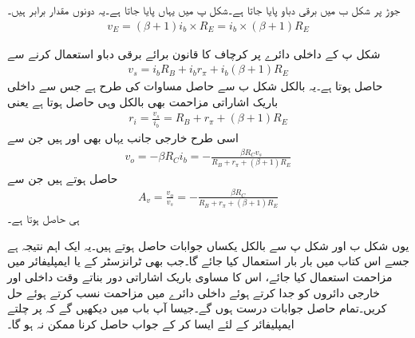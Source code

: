 جوڑ  پر شکل  ب میں  برقی دباو پایا جاتا ہے۔شکل  پ میں یہاں  پایا جاتا ہے۔یہ دونوں مقدار برابر ہیں۔
\begin{align*}
v_E=\left(\beta+1 \right) i_b \times R_E =i_b \times \left(\beta+1 \right)R_E
\end{align*}

شکل  پ کے داخلی دائرے پر کرچاف کا قانون برائے برقی دباو استعمال کرنے سے
\begin{align*}
v_s = i_b R_B+i_b r_{\pi}  + i_b \left(\beta+1 \right )R_E
\end{align*}
حاصل ہوتا ہے۔یہ بالکل شکل  ب سے حاصل مساوات کی طرح ہے  جس سے داخلی باریک اشاراتی مزاحمت بھی بالکل وہی حاصل ہوتا ہے یعنی
\begin{align*}
r_i=\frac{v_s}{i_b}=R_B+r_{\pi}+\left(\beta+1 \right )R_E
\end{align*}
اسی طرح خارجی جانب یہاں بھی  اور  ہیں جن سے
\begin{align*}
v_o=-\beta R_C i_b = -\frac{\beta R_C v_s}{R_B+r_{\pi}+\left ( \beta+1\right )R_E}
\end{align*}
حاصل ہوتے ہیں جن سے
\begin{align*}
A_v=\frac{v_o}{v_s}=-\frac{\beta R_C}{R_B+r_{\pi}+\left(\beta+1 \right )R_E}
\end{align*} 
ہی حاصل ہوتا ہے۔

یوں شکل  ب اور شکل  پ سے بالکل یکساں جوابات حاصل ہوتے ہیں۔یہ ایک اہم نتیجہ ہے جسے اس کتاب میں بار بار استعمال کیا جائے گا۔جب بھی  ٹرانزسٹر کے  یا  ایمپلیفائر میں مزاحمت  استعمال کیا جائے، اس کا مساوی باریک اشاراتی دور بناتے وقت داخلی اور خارجی دائروں کو جدا کرتے ہوئے داخلی دائرے میں  مزاحمت نسب کرتے ہوئے حل کریں۔تمام حاصل جوابات درست ہوں گے۔جیسا آپ  باب  میں دیکھیں گے کہ  پر چلتے ایمپلیفائر کے لئے ایسا کر کے جواب حاصل کرنا ممکن نہ ہو گا۔

